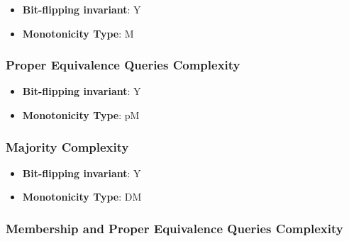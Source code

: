       \begin{definition}\label{def:membership_query_complexity}
      
      \end{definition}
      \begin{itemize}
      \item {\bf Bit-flipping invariant}: Y
      \item {\bf Monotonicity Type}: M
      \end{itemize}
\subsubsection{Proper Equivalence Queries Complexity}
      
      \begin{definition}\label{def:proper_equivalence_queries_complexity}
      
      \end{definition}
      \begin{itemize}
      \item {\bf Bit-flipping invariant}: Y
      \item {\bf Monotonicity Type}: pM
      \end{itemize}
\subsubsection{Majority Complexity}
      
      \begin{definition}\label{def:majority_complexity}
      
      \end{definition}
      \begin{itemize}
      \item {\bf Bit-flipping invariant}: Y
      \item {\bf Monotonicity Type}: DM
      \end{itemize}
\subsubsection{Membership and Proper Equivalence Queries Complexity}
      
